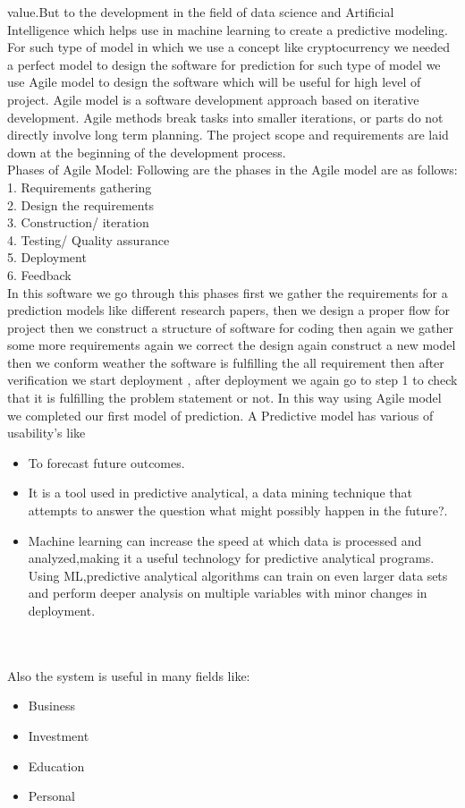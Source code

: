 \documentclass[openany,12pt]{report}
\begin{document}
value.But to the development in the field of data science and Artificial Intelligence which helps use in machine learning to create a predictive modeling.
\\For such type of model in which we use a concept like cryptocurrency we needed a perfect model to design the software for prediction for such type of model we use Agile model to design the software  which will be useful for high level of project. 
Agile model is a software development approach based on iterative development. Agile methods break tasks into smaller iterations, or parts do not directly involve long term planning. The project scope and requirements are laid down at the beginning of the development process.\\
Phases of Agile Model:
Following are the phases in the Agile model are as follows:\\
1. Requirements gathering\\
2. Design the requirements\\
3. Construction/ iteration\\
4. Testing/ Quality assurance\\
5. Deployment\\
6. Feedback\\
In this software we go through this phases first we gather the requirements for a prediction models like different research papers, then we design a proper flow for project then we construct a structure of software for coding then again we gather some more requirements again we correct the design again construct a new model then we conform weather the software is fulfilling the all requirement then after verification we start deployment , after deployment we again go to step 1 to check that it is fulfilling the problem statement or not. In this way using Agile model we completed our first model of prediction. 
A Predictive model has various of usability's like 
\begin{itemize}
\item{To forecast future outcomes.}
\item{It is a tool used in predictive analytical, a data mining technique that attempts to answer the question what might possibly happen in the future?.}
\item{Machine learning can increase the speed at which data is processed and analyzed,making it a useful technology for predictive analytical programs. Using ML,predictive analytical algorithms can train on even larger data sets and perform deeper analysis on multiple variables with minor changes in deployment.}

\end{itemize}
\\ 
\\
\newpage
Also the system is useful in many fields like:
\begin{itemize}
\item{Business}
\item{Investment}
\item{Education}
\item{Personal}
\end{itemize}
\end{document}
